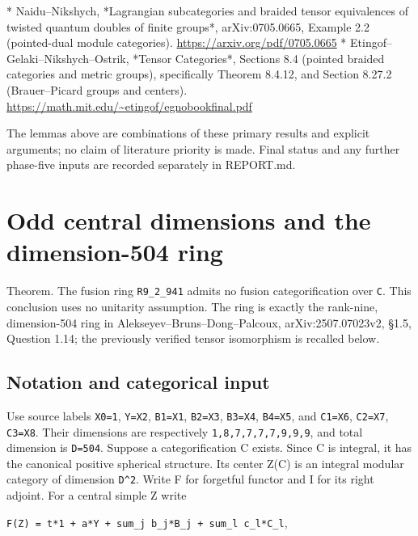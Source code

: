 * Naidu--Nikshych, *Lagrangian subcategories and braided tensor
equivalences of twisted quantum doubles of finite groups*,
arXiv:0705.0665, Example 2.2 (pointed-dual module categories).
\url{https://arxiv.org/pdf/0705.0665} *
Etingof--Gelaki--Nikshych--Ostrik, *Tensor Categories*, Sections 8.4
(pointed braided categories and metric groups), specifically Theorem
8.4.12, and Section 8.27.2 (Brauer--Picard groups and centers).
\url{https://math.mit.edu/~etingof/egnobookfinal.pdf}

The lemmas above are combinations of these primary results and explicit
arguments; no claim of literature priority is made. Final status and any
further phase-five inputs are recorded separately in REPORT.md.

\hypertarget{odd-central-dimensions-and-the-dimension-504-ring}{%
\section{Odd central dimensions and the dimension-504
ring}\label{odd-central-dimensions-and-the-dimension-504-ring}}

Theorem. The fusion ring \texttt{R9\_\allowbreak{}2\_\allowbreak{}941}
admits no fusion categorification over \texttt{C}. This conclusion uses
no unitarity assumption. The ring is exactly the rank-nine,
dimension-504 ring in Alekseyev--Bruns--Dong--Palcoux,
arXiv:2507.07023v2, §1.5, Question 1.14; the previously verified tensor
isomorphism is recalled below.

\hypertarget{notation-and-categorical-input}{%
\subsection{Notation and categorical
input}\label{notation-and-categorical-input}}

Use source labels \texttt{X0=1}, \texttt{Y=X2}, \texttt{B1=X1},
\texttt{B2=X3}, \texttt{B3=X4}, \texttt{B4=X5}, and \texttt{C1=X6},
\texttt{C2=X7}, \texttt{C3=X8}. Their dimensions are respectively
\texttt{1,8,7,\allowbreak{}7,7,7,\allowbreak{}9,9,9}, and total
dimension is \texttt{D=504}. Suppose a categorification C exists. Since
C is integral, it has the canonical positive spherical structure. Its
center Z(C) is an integral modular category of dimension
\texttt{D\textasciicircum{}2}. Write F for forgetful functor and I for
its right adjoint. For a central simple Z write

\texttt{F(Z) =\allowbreak{} t*1 +\allowbreak{} a*Y +\allowbreak{} sum\_\allowbreak{}j b\_\allowbreak{}j*B\_\allowbreak{}j + su\allowbreak{}m\_\allowbreak{}l c\_\allowbreak{}l*C\_\allowbreak{}l},

